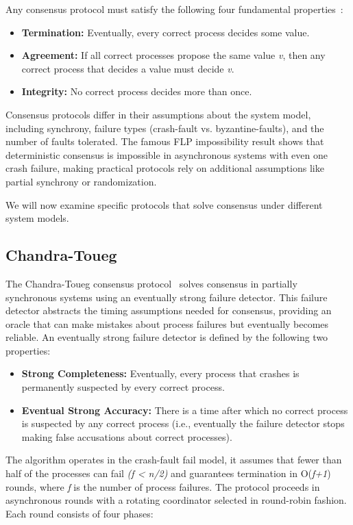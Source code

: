 Any consensus protocol must satisfy the following four fundamental properties~\cite{distributed_systems_concepts}:
\begin{itemize}
  \item \textbf{Termination:} Eventually, every correct process decides some value.
  \item \textbf{Agreement:} If all correct processes propose the same value \textit{v}, 
then any correct process that decides a value must decide \textit{v}.
  \item \textbf{Integrity:} No correct process decides more than once.
\end{itemize}

Consensus protocols differ in their assumptions about the system model, including synchrony,
failure types (crash-fault vs. byzantine-faults), and the number of faults
tolerated. The famous FLP impossibility result shows that deterministic consensus is 
impossible in asynchronous systems with even one crash failure, making practical protocols
rely on additional assumptions like partial synchrony or randomization.

We will now examine specific protocols that solve consensus under different system models.

\subsection{Chandra-Toueg}\label{sub:chandra-toueg}

The Chandra-Toueg consensus protocol~\cite{chandra} solves consensus in partially synchronous
systems using an eventually strong failure detector.
This failure detector abstracts the timing assumptions needed for consensus, providing
an oracle that can make mistakes about process failures but eventually becomes reliable.
An eventually strong failure detector is defined by the following two properties:
\begin{itemize}
  \item \textbf{Strong Completeness:} Eventually, every process that crashes is permanently
  suspected by every correct process.
  \item \textbf{Eventual Strong Accuracy:} There is a time after which no correct process
  is suspected by any correct process (i.e., eventually the failure detector stops making
  false accusations about correct processes).
\end{itemize}

The algorithm operates in the crash-fault fail model, it assumes that fewer than half of the
processes can fail \textit{(f < n/2)} and guarantees termination in O(\textit{f+1})
rounds, where \textit{f} is the number of process failures. The protocol proceeds
in asynchronous rounds with a rotating coordinator selected in round-robin fashion. Each round consists of four phases:

